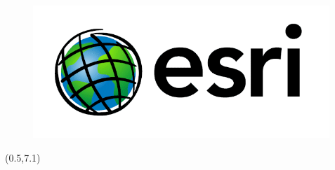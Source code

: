 \documentclass[22pt]{beamer}
\begin{document}
\begin{frame}[fragile]
\begin{textblock}{3.5}
\begin{figure}[htbp]
\hspace{1cm}
\includegraphics[height=5cm]{esri-logo.png}
\end{figure}

\end{textblock}

\begin{textblock}{7.25}(0.5,7.1)



\end{textblock}




\end{frame}
\end{document}
